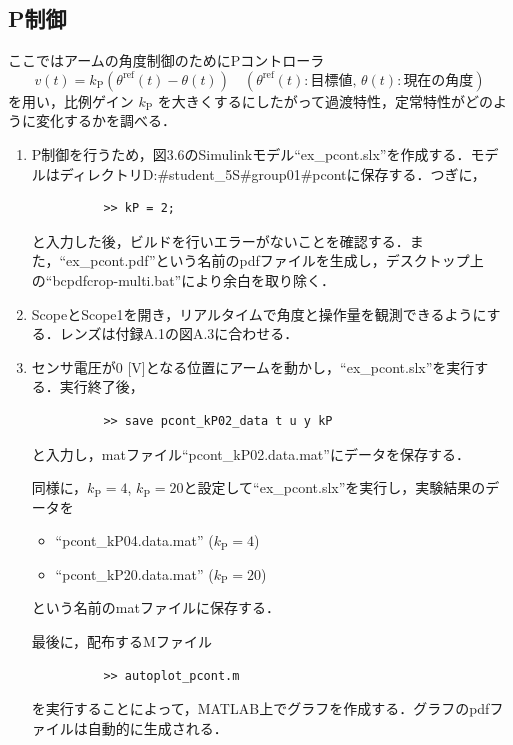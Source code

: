 \subsection{P制御}

ここではアームの角度制御のためにPコントローラ
\begin{equation}
  v(t) = k_{\mathrm{P}} \left( \theta^{\text{ref}}(t) - \theta(t) \right) \quad \left( \theta^{\text{ref}}(t) : \text{目標値} , \, \theta(t) : \text{現在の角度} \right)
\end{equation}
を用い，比例ゲイン $k_{\mathrm{P}}$ を大きくするにしたがって過渡特性，定常特性がどのように変化するかを調べる．


\begin{enumerate}
  \item P制御を行うため，図3.6のSimulinkモデル“ex\_pcont.slx”を作成する．モデルはディレクトリD:\#student\_5S\#group01\#pcontに保存する．つぎに，
        \begin{verbatim}
          >> kP = 2;
        \end{verbatim}
        と入力した後，ビルドを行いエラーがないことを確認する．また，“ex\_pcont.pdf”という名前のpdfファイルを生成し，デスクトップ上の“bcpdfcrop-multi.bat”により余白を取り除く．
        
  \item ScopeとScope1を開き，リアルタイムで角度と操作量を観測できるようにする．レンズは付録A.1の図A.3に合わせる．
        
  \item センサ電圧が0 [V]となる位置にアームを動かし，“ex\_pcont.slx”を実行する．実行終了後，
        \begin{verbatim}
          >> save pcont_kP02_data t u y kP
        \end{verbatim}
        と入力し，matファイル“pcont\_kP02.data.mat”にデータを保存する．
        
        同様に，$k_{\mathrm{P}} = 4$, $k_{\mathrm{P}} = 20$と設定して“ex\_pcont.slx”を実行し，実験結果のデータを
        \begin{itemize}
          \item “pcont\_kP04.data.mat” ($k_{\mathrm{P}} = 4$)
          \item “pcont\_kP20.data.mat” ($k_{\mathrm{P}} = 20$)
        \end{itemize}
        という名前のmatファイルに保存する．
        
        最後に，配布するMファイル
        \begin{verbatim}
          >> autoplot_pcont.m
        \end{verbatim}
        を実行することによって，MATLAB上でグラフを作成する．グラフのpdfファイルは自動的に生成される．
\end{enumerate}

